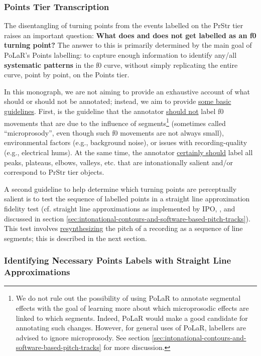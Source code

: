 \subsubsection{Points Tier Transcription}\label{sec:points-tier-transcription}

The disentangling of turning points from the events labelled on the PrStr tier raises an important question: \textbf{What does and does not get labelled as an f0 turning point?} The answer to this is primarily determined by the main goal of PoLaR’s Points labelling: to capture enough information to identify any\slash all \textbf{systematic patterns} in the f0 curve, without simply replicating the entire curve, point by point, on the Points tier.

In this monograph, we are not aiming to provide an exhaustive account of what should or should not be annotated; instead, we aim to provide \uline{some basic guidelines}. First, is the guideline that the annotator \uline{should not} label f0 movements that are due to the influence of segments\footnote{We do not rule out the possibility of using PoLaR to annotate segmental effects with the goal of learning more about which microprosodic effects are linked to which segments. Indeed, PoLaR would make a good candidate for annotating such changes. However, for general uses of PoLaR, labellers are advised to ignore microprosody. See section \ref{sec:intonational-contours-and-software-based-pitch-tracks} for more discussion.} (sometimes called “microprosody”, even though such f0 movements are not always small), environmental factors (e.g., background noise), or issues with recording-quality (e.g., electrical hums). At the same time, the annotator \uline{certainly should} label all peaks, plateaus, elbows, valleys, etc. that are intonationally salient and/or correspond to PrStr tier objects.

A second guideline to help determine which turning points are perceptually salient is to test the sequence of labelled points in a straight line approximation fidelity test (cf. straight line approximations as implemented by IPO, \citealt{t-hart-90}, and discussed in section \ref{sec:intonational-contours-and-software-based-pitch-tracks}). This test involves \uline{resynthesizing} the pitch of a recording as a sequence of line segments; this is described in the next section.

\subsubsection{Identifying Necessary Points Labels with Straight Line Approximations}\label{sec:identifying-necessary-points-labels-with-straight-line-approximations}

